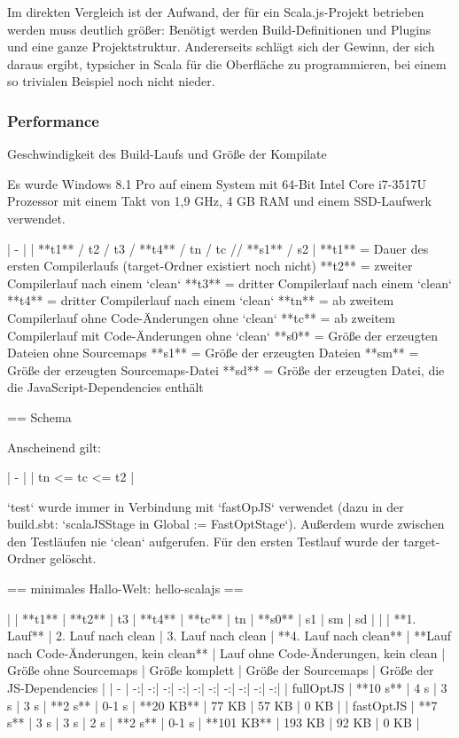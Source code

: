 \documentclass[a4paper, 12pt, listof=totoc, bibliography=totoc]{scrreprt}
\begin{document}


Im direkten Vergleich ist der Aufwand, der für ein Scala.js-Projekt betrieben werden muss deutlich größer: Benötigt werden Build-Definitionen und Plugins und eine ganze Projektstruktur. Andererseits schlägt sich der Gewinn, der sich daraus ergibt, typsicher in Scala für die Oberfläche zu programmieren, bei einem so trivialen Beispiel noch nicht nieder.

\subsubsection{Performance}

Geschwindigkeit des Build-Laufs und Größe der Kompilate

Es wurde Windows 8.1 Pro auf einem System mit 64-Bit Intel Core i7-3517U Prozessor mit einem Takt von 1,9 GHz, 4 GB RAM und einem SSD-Laufwerk verwendet.



| - |
| **t1** / t2 / t3 / **t4** / tn / tc // **s1** / s2 |
**t1** = Dauer des ersten Compilerlaufs (target-Ordner existiert noch nicht)
**t2** = zweiter Compilerlauf nach einem `clean`
**t3** = dritter Compilerlauf nach einem `clean`
**t4** = dritter Compilerlauf nach einem `clean`
**tn** = ab zweitem Compilerlauf ohne Code-Änderungen ohne `clean`
**tc** = ab zweitem Compilerlauf mit Code-Änderungen ohne `clean`
**s0** = Größe der erzeugten Dateien ohne Sourcemaps
**s1** = Größe der erzeugten Dateien
**sm** = Größe der erzeugten Sourcemaps-Datei
**sd** = Größe der erzeugten Datei, die die JavaScript-Dependencies enthält


== Schema

Anscheinend gilt:

| - |
| tn <= tc <= t2 |

`test` wurde immer in Verbindung mit `fastOpJS` verwendet (dazu in der build.sbt: `scalaJSStage in Global := FastOptStage`). Außerdem wurde zwischen den Testläufen nie `clean` aufgerufen. Für den ersten Testlauf wurde der target-Ordner gelöscht.

== minimales Hallo-Welt: hello-scalajs ==

| | **t1** | **t2** | t3 | **t4** | **tc** | tn | **s0** | s1 | sm | sd |
| | **1. Lauf** | 2. Lauf nach clean | 3. Lauf nach clean | **4. Lauf nach clean** | **Lauf nach Code-Änderungen, kein clean** | Lauf ohne Code-Änderungen, kein clean | Größe ohne Sourcemaps | Größe komplett | Größe der Sourcemaps | Größe der  JS-Dependencies |
| - | -:| -:| -:| -:| -:| -:| -:| -:| -:| -:|
| fullOptJS | **10 s** | 4 s | 3 s | 3 s | **2 s** | 0-1 s |  **20 KB** |  77 KB | 57 KB | 0 KB |
| fastOptJS |  **7 s** | 3 s | 3 s | 2 s | **2 s** | 0-1 s | **101 KB** | 193 KB | 92 KB | 0 KB |
\end{document}
